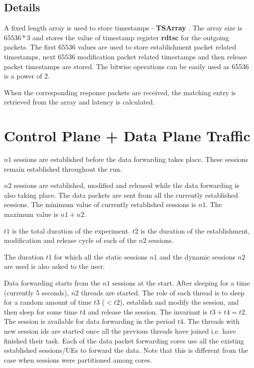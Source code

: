 \subsection{Details}
A fixed length array is used to store timestamps - \textbf{TSArray} . The
array size is $65536 * 3$ and stores the value of timestamp register \textbf{rdtsc} for the
outgoing packets. The first $65536$ values are used to store establishment packet related
timestamps, next $65536$ modification packet related timestamps and then release packet
timestamps are stored.  The bitwise operations can be easily used as 65536 is a power of 2.

When the corresponding response packets are received, the matching entry is retrieved from the array and latency is calculated. 

\section{Control Plane + Data Plane Traffic}

$n1$ sessions are established before the data forwarding takes place. These sessions remain established throughout the run.

$n2$ sessions are established, modified and released while the data forwarding is also taking place. The data packets are sent from all the currently established sessions. The minimum value of currently established sessions is $n1$. The maximum value is $n1+n2$.

$t1$ is the total duration of the experiment.
$t2$ is the  duration of the establishment, modification and release cycle of each of the $n2$ sessions.

The duration $t1$ for which all the static sessions $n1$ and the dynamic sessions $n2$ are used is also asked to the user.

Data forwarding starts from the $n1$ sessions at the start. After sleeping for a time (currently 5
seconds), $n2$ threads are started. The role of each thread is to sleep for a random amount of time
$t3$ ($<t2$), establish and modify the session, and then sleep for some time $t4$ and release the
session. The invariant is $t3+t4= t2$.   The session is available for data forwarding in the period $t4$.  The threads with new session ids are started once all the previous threads have joined i.e. have finished their task.
Each of the data packet forwarding cores use all the existing established sessions/UEs to forward the data. Note that this is different from the case when sessions were partitioned among cores.



